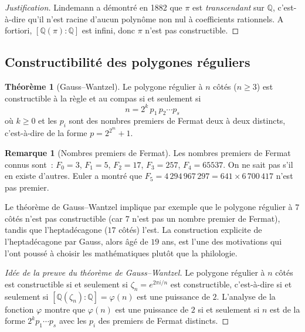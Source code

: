 \documentclass[12pt,a4paper,openany]{book}
\theoremstyle{definition}
\newtheorem{theoreme}{Théorème}[chapter]
\newtheorem{remarque}{Remarque}[chapter]
\newcommand{\Q}{\mathbb{Q}}
\begin{document}
\begin{proof}[Justification]
Lindemann a démontré en 1882 que $\pi$ est \emph{transcendant}
sur $\Q$, c'est-à-dire qu'il n'est racine d'aucun polynôme non nul à
coefficients rationnels. A fortiori, $[\Q(\pi):\Q]$ est infini, donc $\pi$
n'est pas constructible.
\end{proof}

\subsection{Constructibilité des polygones réguliers}\label{ssec:polygones-reguliers}

\begin{theoreme}[Gauss--Wantzel]\label{thm:gauss-wantzel}
Le polygone régulier à $n$ côtés ($n \geq 3$) est constructible à la règle et
au compas si et seulement si
\[
  n = 2^k \, p_1 \, p_2 \cdots p_s
\]
où $k \geq 0$ et les $p_i$ sont des nombres premiers de Fermat deux à deux
distincts, c'est-à-dire de la forme
$p = 2^{2^m} + 1$.
\end{theoreme}

\begin{remarque}[Nombres premiers de Fermat]\label{rem:fermat-primes}
Les nombres premiers de Fermat connus sont~:
$F_0 = 3$, $F_1 = 5$, $F_2 = 17$, $F_3 = 257$, $F_4 = 65537$.
On ne sait pas s'il en existe d'autres. Euler a montré que
$F_5 = 4\,294\,967\,297 = 641 \times 6\,700\,417$ n'est pas premier.

Le théorème de Gauss--Wantzel implique par exemple que le polygone régulier
à $7$ côtés n'est pas constructible (car $7$ n'est pas un nombre premier de
Fermat), tandis que l'heptadécagone ($17$ côtés) l'est. La construction
explicite de l'heptadécagone par Gauss, alors âgé de $19$ ans, est l'une des
motivations qui l'ont poussé à choisir les mathématiques plutôt que la
philologie.
\end{remarque}

\begin{proof}[Idée de la preuve du théorème de Gauss--Wantzel]
Le polygone régulier à $n$ côtés est constructible si et seulement si
$\zeta_n = e^{2\pi i/n}$ est constructible, c'est-à-dire si et seulement si
$[\Q(\zeta_n):\Q] = \varphi(n)$ est une puissance de $2$. L'analyse de la
fonction $\varphi$ montre que $\varphi(n)$ est une puissance de $2$ si et
seulement si $n$ est de la forme $2^k p_1 \cdots p_s$ avec les $p_i$ des
premiers de Fermat distincts.
\end{proof}
\end{document}
